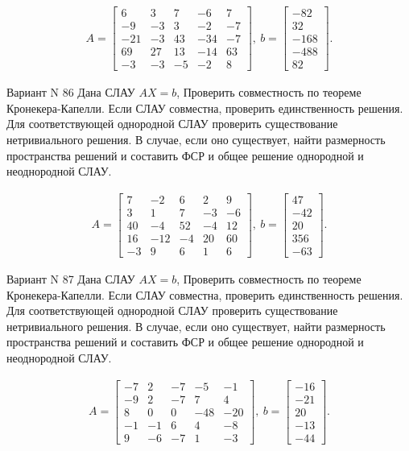 \documentclass[11pt]{report}
\begin{document}
\begin{align*}
 A = \left[\begin{matrix}6 & 3 & 7 & -6 & 7\\-9 & -3 & 3 & -2 & -7\\-21 & -3 & 43 & -34 & -7\\69 & 27 & 13 & -14 & 63\\-3 & -3 & -5 & -2 & 8\end{matrix}\right],
\ b = \left[\begin{matrix}-82\\32\\-168\\-488\\82\end{matrix}\right]. 
 \end{align*}

Вариант N 86
Дана СЛАУ $AX = b$,
Проверить совместность по теореме Кронекера-Капелли. Если СЛАУ совместна, проверить единственность решения.
Для соответствующей однородной СЛАУ проверить существование нетривиального решения. В случае, если оно существует,
найти размерность пространства решений и составить ФСР и общее решение однородной  и неоднородной СЛАУ.


\begin{align*}
 A = \left[\begin{matrix}7 & -2 & 6 & 2 & 9\\3 & 1 & 7 & -3 & -6\\40 & -4 & 52 & -4 & 12\\16 & -12 & -4 & 20 & 60\\-3 & 9 & 6 & 1 & 6\end{matrix}\right],
\ b = \left[\begin{matrix}47\\-42\\20\\356\\-63\end{matrix}\right]. 
 \end{align*}

Вариант N 87
Дана СЛАУ $AX = b$,
Проверить совместность по теореме Кронекера-Капелли. Если СЛАУ совместна, проверить единственность решения.
Для соответствующей однородной СЛАУ проверить существование нетривиального решения. В случае, если оно существует,
найти размерность пространства решений и составить ФСР и общее решение однородной  и неоднородной СЛАУ.


\begin{align*}
 A = \left[\begin{matrix}-7 & 2 & -7 & -5 & -1\\-9 & 2 & -7 & 7 & 4\\8 & 0 & 0 & -48 & -20\\-1 & -1 & 6 & 4 & -8\\9 & -6 & -7 & 1 & -3\end{matrix}\right],
\ b = \left[\begin{matrix}-16\\-21\\20\\-13\\-44\end{matrix}\right]. 
 \end{align*}
\end{document}
